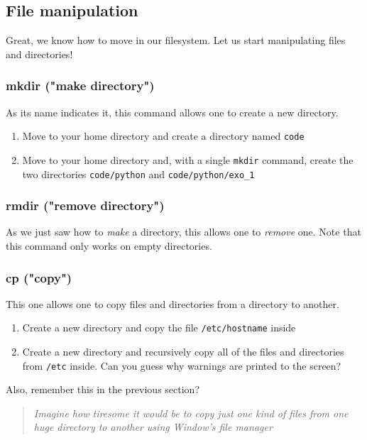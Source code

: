 \documentclass[12pt]{article}
\begin{document}
\subsection{File manipulation}

Great, we know how to move in our filesystem. Let us start manipulating files and directories!

\subsubsection{mkdir ("make directory")}

As its name indicates it, this command allows one to create a new directory.
\begin{enumerate}
\item Move to your home directory and create a directory named \texttt{code}
\item Move to your home directory and, with a single \texttt{mkdir} command, create the two directories \texttt{code/python} and \texttt{code/python/exo\_1}
\end{enumerate}

\subsubsection{rmdir ("remove directory")}

As we just saw how to \textit{make} a directory, this allows one to \textit{remove} one.
Note that this command only works on empty directories.

\subsubsection{cp ("copy")}

This one allows one to copy files and directories from a directory to another.
\begin{enumerate}
\item Create a new directory and copy the file \texttt{/etc/hostname} inside
\item Create a new directory and recursively copy all of the files and directories from \texttt{/etc} inside. Can you guess why warnings are printed to the screen?
\end{enumerate}

Also, remember this in the previous section?

\begin{quote}
\textit{Imagine how tiresome it would be to copy just one kind of files from one huge directory to another using Window's file manager}
\end{quote}
\end{document}
